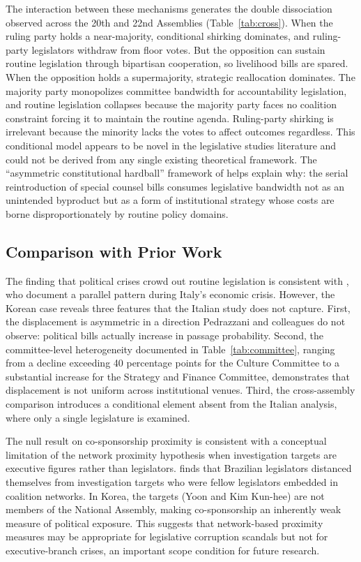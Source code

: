 \documentclass[11pt]{article}
\begin{document}
The interaction between these mechanisms generates the double dissociation observed across the 20th and 22nd Assemblies (Table~\ref{tab:cross}). When the ruling party holds a near-majority, conditional shirking dominates, and ruling-party legislators withdraw from floor votes. But the opposition can sustain routine legislation through bipartisan cooperation, so livelihood bills are spared. When the opposition holds a supermajority, strategic reallocation dominates. The majority party monopolizes committee bandwidth for accountability legislation, and routine legislation collapses because the majority party faces no coalition constraint forcing it to maintain the routine agenda. Ruling-party shirking is irrelevant because the minority lacks the votes to affect outcomes regardless. This conditional model appears to be novel in the legislative studies literature and could not be derived from any single existing theoretical framework. The ``asymmetric constitutional hardball'' framework of \citet{fishkin2018} helps explain why: the serial reintroduction of special counsel bills consumes legislative bandwidth not as an unintended byproduct but as a form of institutional strategy whose costs are borne disproportionately by routine policy domains.

\subsection*{Comparison with Prior Work}

The finding that political crises crowd out routine legislation is consistent with \citet{pedrazzani2018}, who document a parallel pattern during Italy's economic crisis. However, the Korean case reveals three features that the Italian study does not capture. First, the displacement is asymmetric in a direction Pedrazzani and colleagues do not observe: political bills actually increase in passage probability. Second, the committee-level heterogeneity documented in Table~\ref{tab:committee}, ranging from a decline exceeding 40 percentage points for the Culture Committee to a substantial increase for the Strategy and Finance Committee, demonstrates that displacement is not uniform across institutional venues. Third, the cross-assembly comparison introduces a conditional element absent from the Italian analysis, where only a single legislature is examined.

The null result on co-sponsorship proximity is consistent with a conceptual limitation of the network proximity hypothesis when investigation targets are executive figures rather than legislators. \citet{katz2018} finds that Brazilian legislators distanced themselves from investigation targets who were fellow legislators embedded in coalition networks. In Korea, the targets (Yoon and Kim Kun-hee) are not members of the National Assembly, making co-sponsorship an inherently weak measure of political exposure. This suggests that network-based proximity measures may be appropriate for legislative corruption scandals but not for executive-branch crises, an important scope condition for future research.
\end{document}

